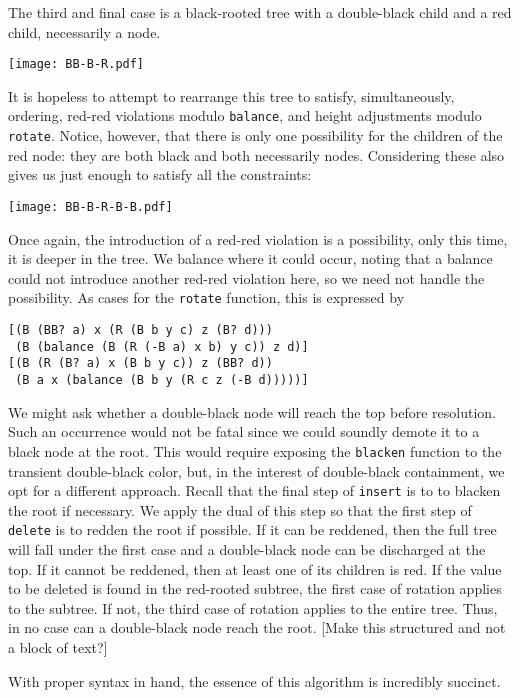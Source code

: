 \documentclass[preprint]{sigplanconf}
\begin{document}
The third and final case is a black-rooted tree with a double-black child and a red child, necessarily a node.
\begin{center}
\texttt{[image: BB-B-R.pdf]}
\end{center}
It is hopeless to attempt to rearrange this tree to satisfy, simultaneously, ordering, red-red violations modulo \texttt{balance}, and height adjustments modulo \texttt{rotate}. Notice, however, that there is only one possibility for the children of the red node: they are both black and both necessarily nodes. Considering these also gives us just enough to satisfy all the constraints:
\begin{center}
\texttt{[image: BB-B-R-B-B.pdf]}
\end{center}
Once again, the introduction of a red-red violation is a possibility, only this time, it is deeper in the tree. We balance where it could occur, noting that a balance could not introduce another red-red violation here, so we need not handle the possibility. As cases for the \texttt{rotate} function, this is expressed by
\begin{verbatim}
[(B (BB? a) x (R (B b y c) z (B? d)))
 (B (balance (B (R (-B a) x b) y c)) z d)]
[(B (R (B? a) x (B b y c)) z (BB? d))
 (B a x (balance (B b y (R c z (-B d)))))]
\end{verbatim}

We might ask whether a double-black node will reach the top before resolution. Such an occurrence would not be fatal since we could soundly demote it to a black node at the root. This would require exposing the \texttt{blacken} function to the transient double-black color, but, in the interest of double-black containment, we opt for a different approach. Recall that the final step of \texttt{insert} is to to blacken the root if necessary. We apply the dual of this step so that the first step of \texttt{delete} is to redden the root if possible. If it can be reddened, then the full tree will fall under the first case and a double-black node can be discharged at the top. If it cannot be reddened, then at least one of its children is red. If the value to be deleted is found in the red-rooted subtree, the first case of rotation applies to the subtree. If not, the third case of rotation applies to the entire tree. Thus, in no case can a double-black node reach the root. [Make this structured and not a block of text?]

With proper syntax in hand, the essence of this algorithm is incredibly succinct.
\end{document}
